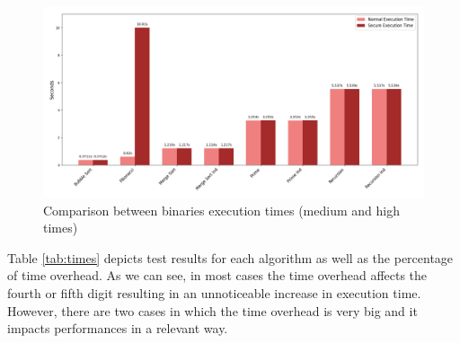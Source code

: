 \begin{figure}[htbp]
  \centering
  \includegraphics[width=\linewidth]{images/high_times.png}
  \caption{Comparison between binaries execution times (medium and high times)}
  \label{fig:hightime}
\end{figure}

Table \ref{tab:times} depicts test results for each algorithm as well as the percentage
of time overhead. As we can see, in most cases the time overhead affects the fourth
or fifth digit resulting in an unnoticeable increase in execution time. However,
there are two cases in which the time overhead is very big and it impacts performances
in a relevant way.

